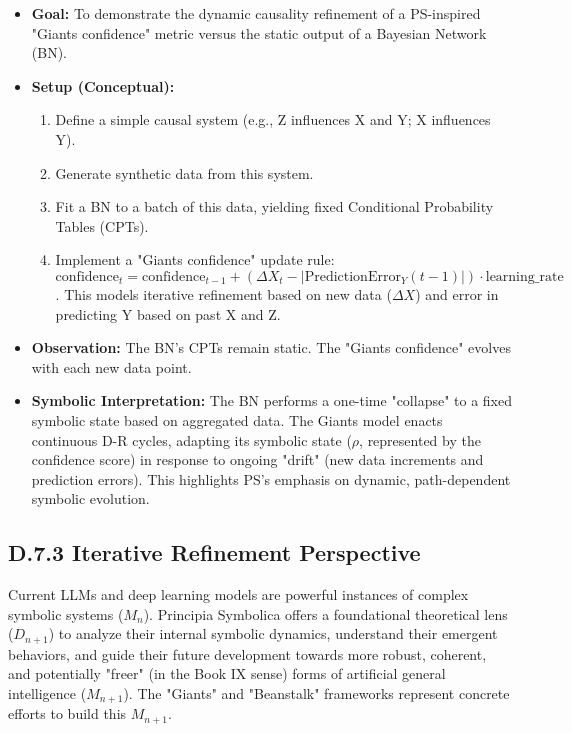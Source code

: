 \begin{itemize}
    \item \textbf{Goal:} To demonstrate the dynamic causality refinement of a PS-inspired "Giants confidence" metric versus the static output of a Bayesian Network (BN).
    \item \textbf{Setup (Conceptual):}
        \begin{enumerate}
            \item Define a simple causal system (e.g., Z influences X and Y; X influences Y).
            \item Generate synthetic data from this system.
            \item Fit a BN to a batch of this data, yielding fixed Conditional Probability Tables (CPTs).
            \item Implement a "Giants confidence" update rule: \( \text{confidence}_{t} = \text{confidence}_{t-1} + (\Delta X_t - |\text{PredictionError}_Y(t-1)|) \cdot \text{learning\_rate} \). This models iterative refinement based on new data (\(\Delta X\)) and error in predicting Y based on past X and Z.
        \end{enumerate}
    \item \textbf{Observation:} The BN's CPTs remain static. The "Giants confidence" evolves with each new data point.
    \item \textbf{Symbolic Interpretation:} The BN performs a one-time "collapse" to a fixed symbolic state based on aggregated data. The Giants model enacts continuous D-R cycles, adapting its symbolic state (\(\rho\), represented by the confidence score) in response to ongoing "drift" (new data increments and prediction errors). This highlights PS's emphasis on dynamic, path-dependent symbolic evolution.
\end{itemize}
\subsection*{D.7.3 Iterative Refinement Perspective}
\label{subsec:appD_ai_iterative_refinement_perspective}
Current LLMs and deep learning models are powerful instances of complex symbolic systems (\(M_n\)). Principia Symbolica offers a foundational theoretical lens (\(D_{n+1}\)) to analyze their internal symbolic dynamics, understand their emergent behaviors, and guide their future development towards more robust, coherent, and potentially "freer" (in the Book IX sense) forms of artificial general intelligence (\(M_{n+1}\)). The "Giants" and "Beanstalk" frameworks represent concrete efforts to build this \(M_{n+1}\).
